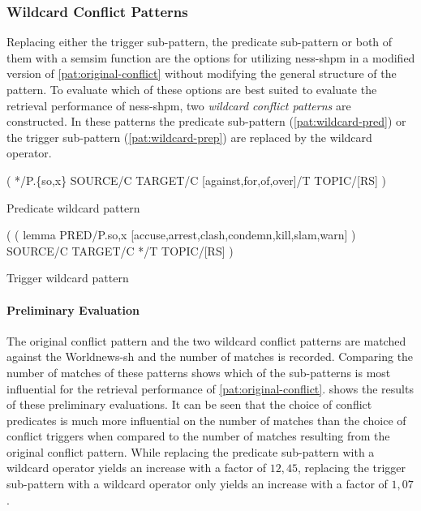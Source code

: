 \documentclass[11pt, numbers=noenddot]{scrreprt}
\begin{document}
\subsubsection{Wildcard Conflict Patterns}
\label{sec:wildcard-conflict-patterns}
Replacing either the trigger sub-pattern, the predicate sub-pattern or both of them with a semsim function are the options for utilizing \gls{ness-shpm} in a modified version of \cref{pat:original-conflict} without modifying the general structure of the pattern. To evaluate which of these options are best suited to evaluate the retrieval performance of \gls{ness-shpm}, two \textit{wildcard conflict patterns} are constructed. In these patterns the predicate sub-pattern (\cref{pat:wildcard-pred}) or the trigger sub-pattern (\cref{pat:wildcard-prep}) are replaced by the wildcard operator. 

\begin{pattern}
  \normalfont\sffamily
  \centering
    ( */P.\{so,x\} SOURCE/C TARGET/C [against,for,of,over]/T TOPIC/[RS] ) 
  \caption{Predicate wildcard pattern}
  \label{pat:wildcard-pred}
\end{pattern}

\begin{pattern}
  \normalfont\sffamily
  \centering
  ( ( lemma PRED/P.{so,x} [accuse,arrest,clash,condemn,kill,slam,warn] ) SOURCE/C TARGET/C */T TOPIC/[RS] )
  \caption{Trigger wildcard pattern}
  \label{pat:wildcard-prep}
\end{pattern}


\paragraph{Preliminary Evaluation}
The original conflict pattern and the two wildcard conflict patterns are matched against the Worldnews-\gls{sh} and the number of matches is recorded. Comparing the number of matches of these patterns shows which of the sub-patterns is most influential for the retrieval performance of \cref{pat:original-conflict}.  shows the results of these preliminary evaluations. It can be seen that the choice of conflict predicates is much more influential on the number of matches than the choice of conflict triggers when compared to the number of matches resulting from the original conflict pattern. While replacing the predicate sub-pattern with a wildcard operator yields an increase with a factor of \(12,45\), replacing the trigger sub-pattern with a wildcard operator only yields an increase with a factor of \(1,07\). 
\end{document}
